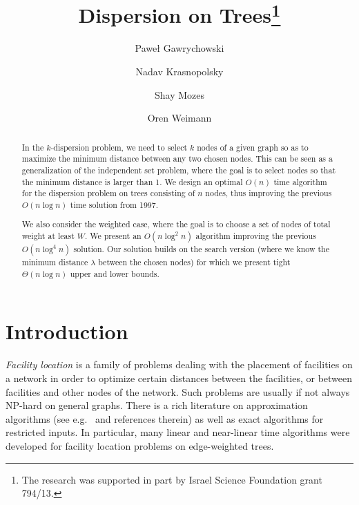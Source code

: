 \documentclass[a4paper,UKenglish]{lipics-v2016}
\title{Dispersion on Trees\protect \thanks{The research was supported in part by Israel Science Foundation grant 794/13.}}
\author[1]{Pawe\l{} Gawrychowski}
\author[1]{Nadav Krasnopolsky}
\author[2]{Shay Mozes}
\author[1]{Oren Weimann}
\affil[1]{University of Haifa, Israel}
\affil[2]{IDC Herzliya, Israel}
\theoremstyle{plain}
\newcommand{\Oh}{{O}}
\begin{document}
\maketitle

\begin{abstract}
In the $k$-dispersion problem, we need to select $k$ nodes of a given graph so as to maximize
the minimum distance between any two chosen nodes. This can be seen as a generalization
of the independent set problem, where the goal is to select nodes so that the minimum distance
is larger than 1.
We design an optimal $\Oh(n)$ time algorithm for the dispersion problem on trees consisting
of $n$ nodes, thus improving the previous  $\Oh(n\log n)$ time solution from 1997. 

We also consider the weighted case, where the goal is to choose a set of nodes of total weight at least $W$. We present an $\Oh(n\log^2n)$ algorithm improving the previous $\Oh(n\log^4 n)$ solution. Our solution builds on the search version (where we know the minimum distance $\lambda$ between the chosen nodes) for which we present tight $\Theta(n\log n)$ upper and lower bounds. 
\end{abstract}

\section{Introduction}

\emph{Facility location} is a family of problems dealing with the placement of facilities on a network in order to optimize certain distances between the facilities, or between facilities and other nodes of the network. Such problems are usually if not always NP-hard on general graphs. There is a rich literature on approximation algorithms (see e.g.~\cite{DavidB.Shmoys1997,Vazirani2003} and references therein) as well as exact algorithms for restricted inputs. In particular, many linear and near-linear time algorithms were developed for facility location problems on edge-weighted trees.   
\end{document}
